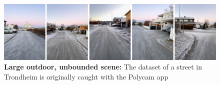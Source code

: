 \begin{figure}[!h]
    \centering
    \includegraphics[width=1.0\textwidth]{figures/streetview-dataset.png}
    \caption{\textbf{Large outdoor, unbounded scene:} The dataset of a street in Trondheim is originally caught with the Polycam app}
    \label{fig:streetview-dataset}
\end{figure}